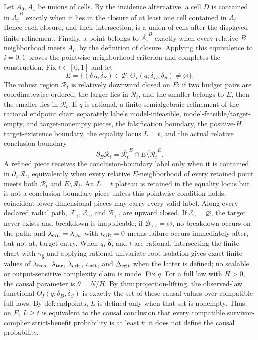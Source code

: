 Let \(A_0,A_1\) be unions of cells. By the incidence alternative, a cell \(D\) is contained in \(\overline{A_i}^{B}\) exactly when it lies in the closure of at least one cell contained in \(A_i\). Hence each closure, and their intersection, is a union of cells after the displayed finite refinement. Finally, a point belongs to \(\overline{A_i}^{B}\) exactly when every relative \(B\)-neighborhood meets \(A_i\), by the definition of closure. Applying this equivalence to \(i=0,1\) proves the pointwise neighborhood criterion and completes the construction.
Fix \(t\in[0,1]\) and let
\[
 E=\{(\delta_D,\delta_S)\in\mathcal B:\Theta_I(q;\delta_D,\delta_S)\neq\varnothing\}.
\]
The robust region \(\mathcal R_t\) is relatively downward closed on \(E\): if two budget pairs are coordinatewise ordered, the larger lies in \(\mathcal R_t\), and the smaller belongs to \(E\), then the smaller lies in \(\mathcal R_t\). If \(q\) is rational, a finite semialgebraic refinement of the rational endpoint chart separately labels model-infeasible, model-feasible/target-empty, and target-nonempty pieces, the falsification boundary, the positive-\(H\) target-existence boundary, the equality locus \(L=t\), and the actual relative conclusion boundary
\[
 \partial_E\mathcal R_t
 =\overline{\mathcal R_t}^{E}
  \cap\overline{E\setminus\mathcal R_t}^{E}.
\]
A refined piece receives the conclusion-boundary label only when it is contained in \(\partial_E\mathcal R_t\), equivalently when every relative \(E\)-neighborhood of every retained point meets both \(\mathcal R_t\) and \(E\setminus\mathcal R_t\). An \(L=t\) plateau is retained in the equality locus but is not a conclusion-boundary piece unless this pointwise condition holds; coincident lower-dimensional pieces may carry every valid label. Along every declared radial path, \(\mathcal F_\gamma\), \(\mathcal E_\gamma\), and \(\mathcal B_{\gamma,t}\) are upward closed. If \(\mathcal E_\gamma=\varnothing\), the target never exists and breakdown is inapplicable; if \(\mathcal B_{\gamma,t}=\varnothing\), no breakdown occurs on the path; and \(\lambda_{\rm crit}=\lambda_{\rm tar}\) with \(\iota_{\rm crit}=0\) means failure occurs immediately after, but not at, target entry. When \(q\), \(\bar{\boldsymbol\delta}\), and \(t\) are rational, intersecting the finite chart with \(\gamma_{\bar{\boldsymbol\delta}}\) and applying rational univariate root isolation gives exact finite values of \(\lambda_{\rm feas}\), \(\lambda_{\rm tar}\), \(\lambda_{\rm crit}\), \(\iota_{\rm crit}\), and \(\Delta_{\rm crit}\) when the latter is defined; no scalable or output-sensitive complexity claim is made.
Fix \(q\). For a full law with \(H>0\), the causal parameter is \(\theta=N/H\). By \(\mathrm{thm:projection\text{-}lifting}\), the observed-law functional \(\Theta_I(q;\delta_D,\delta_S)\) is exactly the set of these causal values over compatible full laws. By \(\mathrm{def:endpoints}\), \(L\) is defined only when that set is nonempty. Thus, on \(E\), \(L\geq t\) is equivalent to the causal conclusion that every compatible survivor-complier strict-benefit probability is at least \(t\); it does not define the causal probability.


